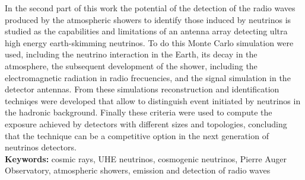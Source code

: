 \begin{titlepage}
In the second part of this work the potential of the detection of the radio waves produced by the atmospheric showers to identify those induced by neutrinos is studied as the capabilities and limitations of an antenna array detecting ultra high energy earth-skimming neutrinos.
To do this Monte Carlo simulation were used, including the neutrino interaction in the Earth, its decay in the atmosphere, the subsequent development of the shower, including the electromagnetic radiation in radio frecuencies, and the signal simulation in the detector antennas.
From these simulations reconstruction and identification techniqes were developed that allow to distinguish event initiated by neutrinos in the hadronic background.
Finally these criteria were used to compute the exposure achieved by detectors with different sizes and topologies, concluding that the technique can be a competitive option in the next generation of neutrinos detectors.\\[0.2cm]

\noindent
\textbf{Keywords: } cosmic rays, UHE neutrinos, cosmogenic neutrinos, Pierre Auger Observatory, atmospheric showers, emission and detection of radio waves\\

\end{titlepage}












